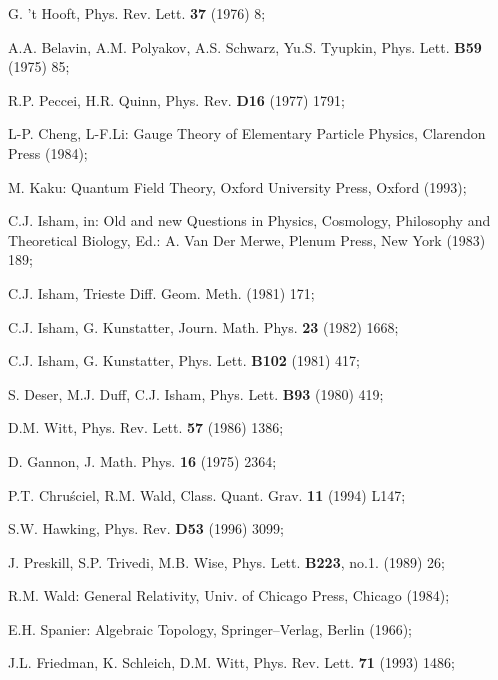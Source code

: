 \documentclass[a4paper,12pt,draft]{article}
\begin{document}
\begin{thebibliography}{99}

 G. 't Hooft, Phys. Rev. Lett. {\bf 37} (1976) 8;

  A.A. Belavin, A.M. Polyakov, A.S. Schwarz,
Yu.S. Tyupkin, Phys. Lett. {\bf B59} (1975) 85;

 R.P. Peccei, H.R. Quinn, Phys. Rev. {\bf D16} (1977) 1791;

 L-P. Cheng, L-F.Li: Gauge Theory of Elementary
Particle Physics, Clarendon Press (1984);

 M. Kaku: Quantum Field Theory, Oxford University
Press, Oxford (1993);

 C.J. Isham, in: Old and new Questions in Physics,
Cosmology, Philosophy and Theoretical Biology, Ed.: A. Van Der Merwe,
Plenum Press, New York (1983) 189; 

 C.J. Isham, Trieste Diff. Geom. Meth. (1981) 171;

 C.J. Isham, G. Kunstatter, Journ. Math. Phys. 
{\bf 23} (1982) 1668;

 C.J. Isham, G. Kunstatter, Phys. Lett. {\bf B102}
(1981) 417;

 S. Deser, M.J. Duff, C.J. Isham, Phys. Lett. {\bf B93} 
(1980) 419;

 D.M. Witt, Phys. Rev. Lett. {\bf 57} (1986) 1386;

 D. Gannon, J. Math. Phys. {\bf 16} (1975) 2364;

 P.T. Chru\'sciel, R.M. Wald, Class. Quant. Grav.
{\bf 11} (1994) L147;

 S.W. Hawking, Phys. Rev. {\bf D53} (1996) 3099;

 J. Preskill, S.P. Trivedi, M.B. Wise, Phys. Lett.
{\bf B223}, no.1. (1989) 26;

 R.M. Wald: General Relativity, Univ. of Chicago Press,
Chicago (1984);

 E.H. Spanier: Algebraic Topology, Springer--Verlag, Berlin
(1966);

 J.L. Friedman, K. Schleich, D.M. Witt, Phys. Rev. Lett.
{\bf 71} (1993) 1486;

\end{thebibliography}
\end{document}
